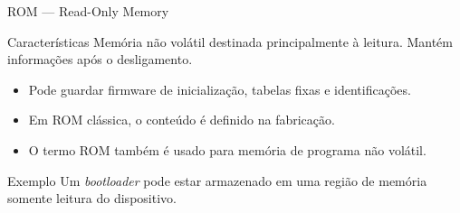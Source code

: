 \begin{frame}[t]{ROM --- Read-Only Memory}
  \begin{block}{Características}
    Memória não volátil destinada principalmente à leitura. Mantém informações após o desligamento.
  \end{block}
  \begin{itemize}
    \item Pode guardar firmware de inicialização, tabelas fixas e identificações.
    \item Em ROM clássica, o conteúdo é definido na fabricação.
    \item O termo ROM também é usado para memória de programa não volátil.
  \end{itemize}
  \begin{exampleblock}{Exemplo}
    Um \textit{bootloader} pode estar armazenado em uma região de memória somente leitura do dispositivo.
  \end{exampleblock}
\end{frame}
